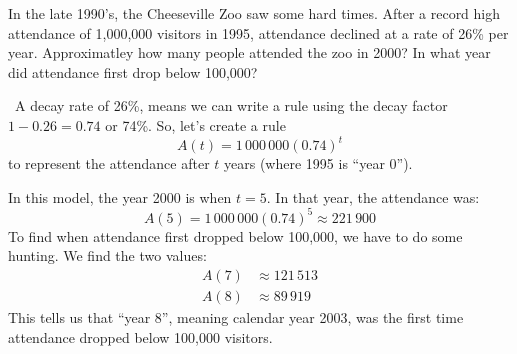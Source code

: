 \begin{boxex}
In the late 1990's, the Cheeseville Zoo saw some hard times. After a record high attendance of 1,000,000 visitors in 1995, attendance declined at a rate of 26\% per year. Approximatley how many people attended the zoo in 2000? In what year did attendance first drop below 100,000?


\exsoln\ A decay rate of 26\%, means we can write a rule using the decay factor $1-0.26 = 0.74$ or 74\%. So, let's create a rule \[A(t) = 1\,000\,000(0.74)^t\] to represent the attendance after $t$ years (where 1995 is ``year 0'').

In this model, the year 2000 is when $t=5$. In that year, the attendance was:
\[A(5) = 1\,000\,000(0.74)^5 \approx 221\,900\]
To find when attendance first dropped below 100,000, we have to do some hunting. We find the two values:
\[\begin{aligned}
A(7) &\approx 121\,513
\\
A(8) &\approx 89\,919
\end{aligned}\]
This tells us that ``year 8'', meaning calendar year 2003, was the first time attendance dropped below 100,000 visitors.
\end{boxex}

%
%
%
%
%
%


